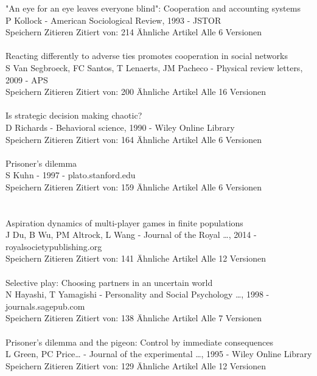 \documentclass[11pt]{article}
\begin{document}
\noindent 
"An eye for an eye leaves everyone blind": Cooperation and accounting systems\\
P Kollock - American Sociological Review, 1993 - JSTOR\\
Speichern Zitieren Zitiert von: 214 Ähnliche Artikel Alle 6 Versionen\\
\\
\noindent 
Reacting differently to adverse ties promotes cooperation in social networks\\
S Van Segbroeck, FC Santos, T Lenaerts, JM Pacheco - Physical review letters, 2009 - APS\\
Speichern Zitieren Zitiert von: 200 Ähnliche Artikel Alle 16 Versionen\\
\\
\noindent 
Is strategic decision making chaotic?\\
D Richards - Behavioral science, 1990 - Wiley Online Library\\
Speichern Zitieren Zitiert von: 164 Ähnliche Artikel Alle 6 Versionen\\
\\
\noindent 
[HTML] Prisoner's dilemma\\
S Kuhn - 1997 - plato.stanford.edu\\
Speichern Zitieren Zitiert von: 159 Ähnliche Artikel Alle 6 Versionen\\
\\
\\
\noindent 
Aspiration dynamics of multi-player games in finite populations\\
J Du, B Wu, PM Altrock, L Wang - Journal of the Royal …, 2014 - royalsocietypublishing.org\\
Speichern Zitieren Zitiert von: 141 Ähnliche Artikel Alle 12 Versionen\\
\\
\noindent 
Selective play: Choosing partners in an uncertain world\\
N Hayashi, T Yamagishi - Personality and Social Psychology …, 1998 - journals.sagepub.com\\
Speichern Zitieren Zitiert von: 138 Ähnliche Artikel Alle 7 Versionen\\
\\
\noindent 
Prisoner's dilemma and the pigeon: Control by immediate consequences\\
L Green, PC Price… - Journal of the experimental …, 1995 - Wiley Online Library\\
Speichern Zitieren Zitiert von: 129 Ähnliche Artikel Alle 12 Versionen\\
\end{document}
